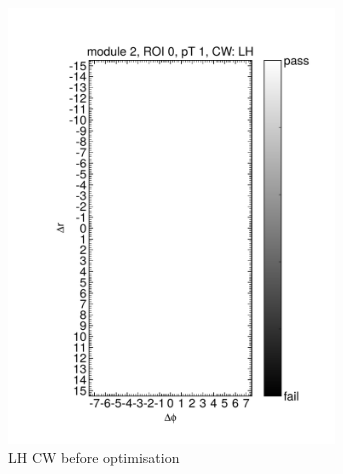 \begin{figure}[htbp]
\begin{subfigure}[b]{0.45\textwidth}
		\includegraphics[width=0.95\textwidth]{figures/muontrigger/l1mu4/cw_0025/cwplot_module2_roi0_pt1_cwLH.pdf}
		\caption{LH CW before optimisation}
	\end{subfigure}
	\\
	\begin{subfigure}[b]{0.45\textwidth}
		\centering

\end{subfigure}
\end{figure}
